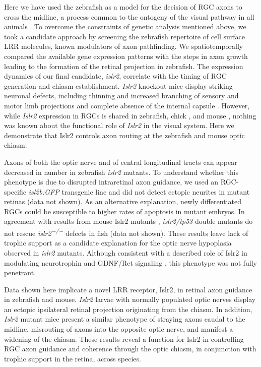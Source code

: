 Here we have used the zebrafish as a model for the decision of RGC axons to cross the midline, a process common to the ontogeny of the visual pathway in all animals \cite{jeffery2005variations}.
To overcome the constraints of genetic analysis mentioned above, we took a candidate approach by screening the zebrafish repertoire of cell surface LRR molecules, known modulators of axon pathfinding.
We spatiotemporally compared the available gene expression patterns with the steps in axon growth leading to the formation of the retinal projection in zebrafish.
The expression dynamics of our final candidate, \emph{islr2}, correlate with the timing of RGC generation and chiasm establishment.
\emph{Islr2} knockout mice display striking neuronal defects, including thinning and increased branching of sensory and motor limb projections \cite{mandai2009lig} and complete absence of the internal capsule \cite{mandai2014linx}.
However, while \emph{Islr2} expression in RGCs is shared in zebrafish, chick \cite{gejima2006lrr}, and mouse \cite{blackshaw2004genomic}, nothing was known about the functional role of \emph{Islr2} in the visual system.
Here we demonstrate that Islr2 controls axon routing at the zebrafish and mouse optic chiasm.

Axons of both the optic nerve and of central longitudinal tracts can appear decreased in number in zebrafish \emph{islr2} mutants.
To understand whether this phenotype is due to disrupted intraretinal axon guidance, we used an RGC-specific \emph{isl2b:GFP} transgenic line \cite{pittman2008pathfinding} and did not detect ectopic neurites in mutant retinas (data not shown).
As an alternative explanation, newly differentiated RGCs could be susceptible to higher rates of apoptosis in mutant embryos.
In agreement with results from mouse Islr2 mutants \cite{mandai2009lig}, \emph{islr2/tp53} double mutants do not rescue \emph{islr2\textsuperscript{−/−}} defects in fish (data not shown).
These results leave lack of trophic support as a candidate explanation for the optic nerve hypoplasia observed in \emph{islr2} mutants.
Although consistent with a described role of Islr2 in modulating neurotrophin and GDNF/Ret signaling \cite{mandai2009lig}, this phenotype was not fully penetrant.

Data shown here implicate a novel LRR receptor, Islr2, in retinal axon guidance in zebrafish and mouse.
\emph{Islr2} larvae with normally populated optic nerves display an ectopic ipsilateral retinal projection originating from the chiasm.
In addition, \emph{Islr2} mutant mice present a similar phenotype of straying axons caudal to the midline, misrouting of axons into the opposite optic nerve, and manifest a widening of the chiasm.
These results reveal a function for Islr2 in controlling RGC axon guidance and coherence through the optic chiasm, in conjunction with trophic support in the retina, across species.

